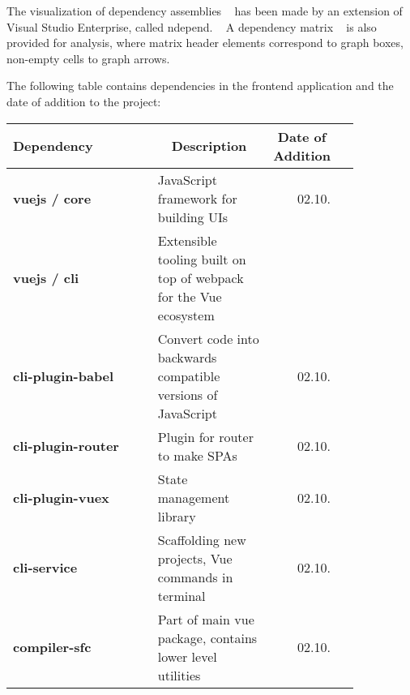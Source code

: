 The visualization of dependency assemblies ~\cite{backendDependencyGraph} has been made by an extension of Visual Studio Enterprise, called ndepend. ~\cite{ndepend} A dependency matrix ~\cite{backendDependencyMatrix} is also provided for analysis, where matrix header elements correspond to graph boxes, non-empty cells to graph arrows. ~\cite{ndependDependencyMatrixGuide}

The following table contains dependencies in the frontend application and the date of addition to the project:

\begin{table}[h!]
\centering
    \begin{tabular}{ p{0.45\linewidth} p{0.35\linewidth} r p{0.05\linewidth} }
      \toprule
      Dependency & \multicolumn{1}{c}{Description} & \multicolumn{1}{c}{Date of Addition} \\
      
      \midrule
      \addlinespace[0.2cm]
      
      \textbf{vuejs / core} & JavaScript framework for building UIs & 02.10. \\
      
      \addlinespace[0.2cm]
      \midrule
      \addlinespace[0.2cm]
      
      \textbf{vuejs / cli} & Extensible tooling built on top of webpack for the Vue ecosystem & \\
      
      \addlinespace[0.2cm]
      
      \textbf{cli-plugin-babel} & Convert code into backwards compatible versions of JavaScript & 02.10. \\
      
      \addlinespace[0.2cm]
      
      \textbf{cli-plugin-router} & Plugin for router to make SPAs & 02.10. \\
      
      \addlinespace[0.2cm]
      
      \textbf{cli-plugin-vuex} & State management library & 02.10. \\
      
      \addlinespace[0.2cm]
      
      \textbf{cli-service} & Scaffolding new projects, Vue commands in terminal & 02.10. \\
      
      \addlinespace[0.2cm]
      
      \textbf{compiler-sfc} & Part of main vue package, contains lower level utilities & 02.10. \\
      

\end{tabular}
\end{table}
